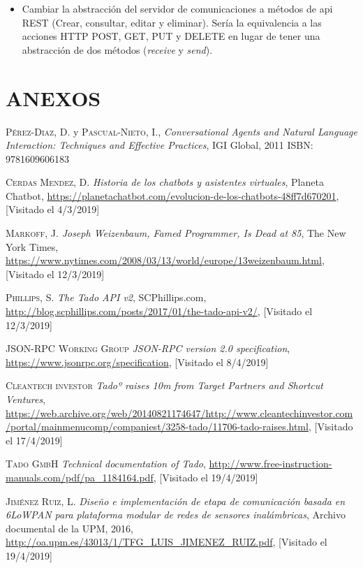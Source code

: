 \documentclass[spanish,12pt, a4paper, twoside]{paper}
\let\oldsection\section
\def\section{\cleardoublepage\oldsection}
\begin{document}
\begin{itemize}
\item Cambiar la abstracción del servidor de comunicaciones a métodos de api REST (Crear, consultar, editar y eliminar). Sería la equivalencia a las acciones HTTP POST, GET, PUT y DELETE en lugar de tener una abstracción de dos métodos (\emph{receive} y \emph{send}).
\end{itemize}

\section*{ANEXOS}


\newpage

\begin{thebibliography}{00}
 \textsc{Pérez-Diaz, D.} y \textsc{Pascual-Nieto, I.},
	\textit{Conversational Agents and Natural Language Interaction: Techniques and Effective Practices}, IGI Global, 2011 ISBN: 9781609606183
	
 \textsc{Cerdas Mendez, D.}
	\textit{Historia de los chatbots y asistentes virtuales}, Planeta Chatbot, \url{https://planetachatbot.com/evolucion-de-los-chatbots-48ff7d670201}, [Visitado el 4/3/2019]
	
 \textsc{Markoff, J.}
	\textit{Joseph Weizenbaum, Famed Programmer, Is Dead at 85}, The New York Times, \url{https://www.nytimes.com/2008/03/13/world/europe/13weizenbaum.html}, [Visitado el 12/3/2019]
	
 \textsc{Phillips, S.}
	\textit{The Tado API v2}, SCPhillips.com, \url{http://blog.scphillips.com/posts/2017/01/the-tado-api-v2/}, [Visitado el 12/3/2019]
	
 \textsc{JSON-RPC Working Group} \textit{JSON-RPC version 2.0 specification}, \url{https://www.jsonrpc.org/specification}, [Visitado el 8/4/2019]

 \textsc{Cleantech investor} \textit{Tadoº raises \texteuro10m from Target Partners and Shortcut Ventures}, \url{https://web.archive.org/web/20140821174647/http://www.cleantechinvestor.com/portal/mainmenucomp/companiest/3258-tado/11706-tado-raises.html}, [Visitado el 17/4/2019]

 \textsc{Tado GmbH} \textit{Technical documentation of Tado}, \url{http://www.free-instruction-manuals.com/pdf/pa_1184164.pdf}, [Visitado el 19/4/2019]

 \textsc{Jiménez Ruiz, L.} \textit{Diseño e implementación de etapa de comunicación basada en 6LoWPAN para plataforma modular de redes de sensores inalámbricas}, Archivo documental de la UPM, 2016, \url{http://oa.upm.es/43013/1/TFG_LUIS_JIMENEZ_RUIZ.pdf}, [Visitado el 19/4/2019]


\end{thebibliography}
\end{document}
